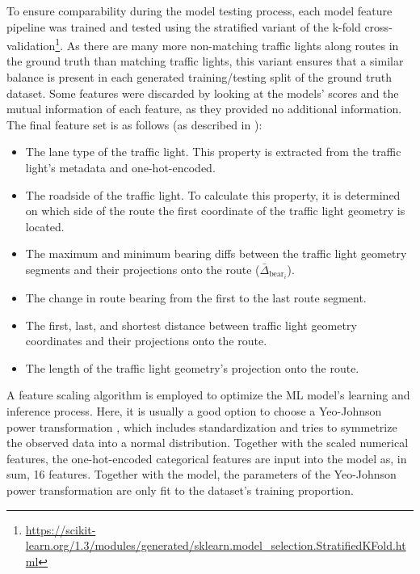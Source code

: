 To ensure comparability during the model testing process, each model feature pipeline was trained and tested using the stratified variant of the k-fold cross-validation\footnote{\url{https://scikit-learn.org/1.3/modules/generated/sklearn.model_selection.StratifiedKFold.html}}. As there are many more non-matching traffic lights along routes in the ground truth than matching traffic lights, this variant ensures that a similar balance is present in each generated training/testing split of the ground truth dataset. Some features were discarded by looking at the models' scores and the mutual information of each feature, as they provided no additional information. The final feature set is as follows (as described in \cite{matthes2023geo}):

\begin{itemize}
    \item The lane type of the traffic light. This property is extracted from the traffic light's metadata and one-hot-encoded.
    \item The roadside of the traffic light. To calculate this property, it is determined on which side of the route the first coordinate of the traffic light geometry is located.
    \item The maximum and minimum bearing diffs between the traffic light geometry segments and their projections onto the route ($\bar{\Delta}_{\text{bear}_i}$).
    \item The change in route bearing from the first to the last route segment. 
    \item The first, last, and shortest distance between traffic light geometry coordinates and their projections onto the route.
    \item The length of the traffic light geometry's projection onto the route.
\end{itemize}

A feature scaling algorithm is employed to optimize the ML model's learning and inference process. Here, it is usually a good option to choose a Yeo-Johnson power transformation \cite{yeo_new_2000}, which includes standardization and tries to symmetrize the observed data into a normal distribution. Together with the scaled numerical features, the one-hot-encoded categorical features are input into the model as, in sum, 16 features. Together with the model, the parameters of the Yeo-Johnson power transformation are only fit to the dataset's training proportion.

